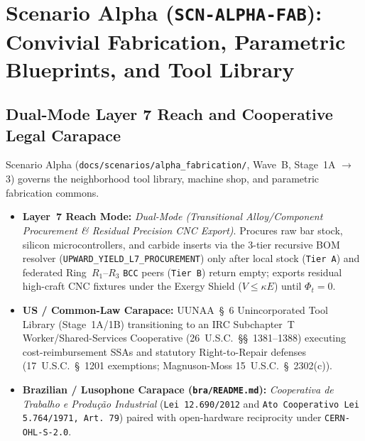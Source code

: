 \chapter{Scenario Alpha (\texttt{SCN-ALPHA-FAB}): Convivial Fabrication, Parametric Blueprints, and Tool Library}
\label{app:scenario-alpha}

\section{Dual-Mode Layer 7 Reach and Cooperative Legal Carapace}
Scenario Alpha (\texttt{docs/scenarios/alpha\_fabrication/}, Wave~B, Stage~1A $\to$ 3) governs the neighborhood tool library, machine shop, and parametric fabrication commons.
\begin{itemize}
    \item \textbf{Layer~7 Reach Mode:} \textit{Dual-Mode (Transitional Alloy/Component Procurement \& Residual Precision CNC Export)}. Procures raw bar stock, silicon microcontrollers, and carbide inserts via the 3-tier recursive BOM resolver (\texttt{UPWARD\_YIELD\_L7\_PROCUREMENT}) only after local stock (\texttt{Tier~A}) and federated Ring~$R_1\text{--}R_3$ \texttt{BCC} peers (\texttt{Tier~B}) return empty; exports residual high-craft CNC fixtures under the Exergy Shield ($V \le \kappa E$) until $\Phi_t = 0$.
    \item \textbf{US / Common-Law Carapace:} UUNAA~\S~6 Unincorporated Tool Library (Stage~1A/1B) transitioning to an IRC Subchapter~T Worker/Shared-Services Cooperative (26~U.S.C.~\S\S~1381--1388) executing cost-reimbursement SSAs and statutory Right-to-Repair defenses (17~U.S.C.~\S~1201 exemptions; Magnuson-Moss 15~U.S.C.~\S~2302(c)).
    \item \textbf{Brazilian / Lusophone Carapace (\texttt{bra/README.md}):} \textit{Cooperativa de Trabalho e Produ{\c{c}}{\~a}o Industrial} (\texttt{Lei 12.690/2012} and \texttt{Ato Cooperativo Lei 5.764/1971, Art.~79}) paired with open-hardware reciprocity under \texttt{CERN-OHL-S-2.0}.
\end{itemize}

